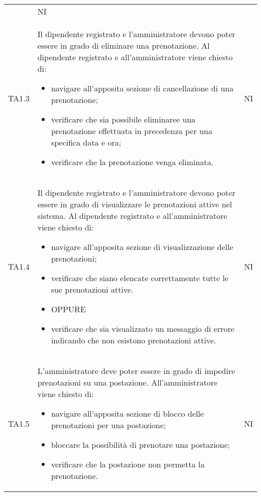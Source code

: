 {\begin{longtable}{ c C{11cm} c }
\begin{itemize}
        \end{itemize}&
        NI\\
        TA1.3&
        Il dipendente registrato e l'amministratore devono poter essere in grado di eliminare una prenotazione.\newline
        Al dipendente registrato e all'amministratore viene chiesto di:
        \begin{itemize}
            \item navigare all'apposita sezione di cancellazione di una prenotazione;
            \item verificare che sia possibile eliminaree una prenotazione effettuata in precedenza per una specifica data e ora;
            \item verificare che la prenotazione venga eliminata.
        \end{itemize}&
        NI\\
        TA1.4&
        Il dipendente registrato e l'amministratore devono poter essere in grado di visualizzare le prenotazioni attive nel sistema.\newline
        Al dipendente registrato e all'amministratore viene chiesto di:
        \begin{itemize}
            \item navigare all'apposita sezione di visualizzazione delle prenotazioni;
            \item verificare che siano elencate correttamente tutte le sue prenotazioni attive.
            \item [] OPPURE
            \item verificare che sia visualizzato un messaggio di errore indicando che non esistono prenotazioni attive.
        \end{itemize}&
        NI\\
        TA1.5&
        L'amministratore deve poter essere in grado di impedire prenotazioni su una postazione.\newline
        All'amministratore viene chiesto di:
        \begin{itemize}
            \item navigare all'apposita sezione di blocco delle prenotazioni per una postazione;
            \item bloccare la possibilità di prenotare una postazione;
            \item verificare che la postazione non permetta la prenotazione.
        \end{itemize}&
        NI\\

\end{longtable}}
